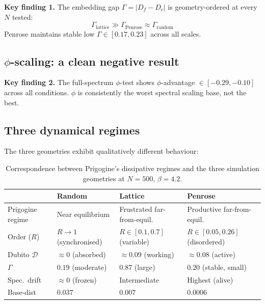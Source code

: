\documentclass[12pt,a4paper]{article}
\theoremstyle{plain}
\theoremstyle{definition}
\begin{document}
\begin{keyresult}
\textbf{Key finding 1.} The embedding gap $\Gamma = |D_f - D_c|$ is
geometry-ordered at every $N$ tested:
\[
\Gamma_{\text{lattice}} \gg \Gamma_{\text{Penrose}} \approx \Gamma_{\text{random}}
\]
Penrose maintains stable low $\Gamma \in [0.17, 0.23]$ across all scales.
\end{keyresult}

\subsection{$\phi$-scaling: a clean negative result}

\begin{keyresult}
\textbf{Key finding 2.} The full-spectrum $\phi$-test shows
$\phi$-advantage $\in [-0.29, -0.10]$ across all conditions.
$\phi$ is consistently the worst spectral scaling base, not the best.
\end{keyresult}

\newpage
\subsection{Three dynamical regimes}

The three geometries exhibit qualitatively different behaviour:

\begin{table}[H]
\centering
\caption{Correspondence between Prigogine's dissipative regimes and the
  three simulation geometries at $N = 500$, $\beta = 4.2$.}
\label{tab:prigogine}
\begin{tabular}{p{2.5cm}p{3.5cm}p{3.5cm}p{3.5cm}}
\toprule
 & \textbf{Random} & \textbf{Lattice} & \textbf{Penrose} \\
\midrule
Prigogine regime &
  Near equilibrium &
  Frustrated far-from-equil. &
  Productive far-from-equil. \\[4pt]
Order ($R$) &
  $R \to 1$ (synchronised) &
  $R \in [0.1, 0.7]$ (variable) &
  $R \in [0.05, 0.26]$ (disordered) \\[4pt]
Dubito $\mathcal{D}$ &
  $\approx 0$ (absorbed) &
  $\approx 0.09$ (working) &
  $\approx 0.08$ (active) \\[4pt]
$\Gamma$ &
  $0.19$ (moderate) &
  $0.87$ (large) &
  $0.20$ (stable, small) \\[4pt]
Spec.\ drift &
  $\approx 0$ (frozen) &
  Intermediate &
  Highest (alive) \\[4pt]
Base-dist &
  $0.037$ &
  $0.007$ &
  $\mathbf{0.0006}$ \\
\bottomrule
\end{tabular}
\end{table}
\end{document}
